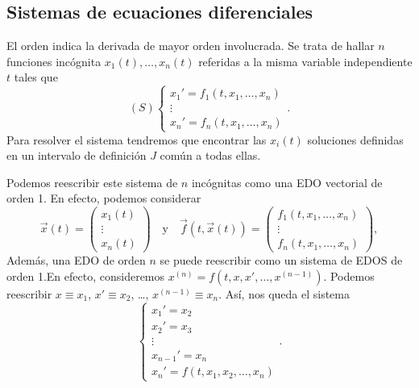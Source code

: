 \subsection{Sistemas de ecuaciones diferenciales}
\begin{definition}
El orden indica la derivada de mayor orden involucrada. Se trata de hallar $\displaystyle n $ funciones incógnita $\displaystyle x_{1}\left(t\right), \ldots, x_{n}\left(t\right) $ referidas a la misma variable independiente $\displaystyle t $ tales que
\[ \left(S\right)
\begin{cases}
x_{1}' = f_{1}\left(t, x_{1}, \ldots, x_{n}\right) \\
\vdots \\
x_{n}' = f_{n}\left(t, x_{1}, \ldots, x_{n}\right)
\end{cases}
.\]
Para resolver el sistema tendremos que encontrar las $\displaystyle x_{i}\left(t\right) $ soluciones definidas en un intervalo de definición $\displaystyle J $ común a todas ellas.
\end{definition}
Podemos reescribir este sistema de $\displaystyle n $ incógnitas como una EDO vectorial de orden 1. En efecto, podemos considerar
\[\vec{x}\left(t\right) = \begin{pmatrix} x_{1}\left(t\right) \\ \vdots \\ x_{n}\left(t\right) \end{pmatrix} \quad \text{y} \quad \vec{f}\left(t, \vec{x}\left(t\right)\right) = \begin{pmatrix} f_{1}\left(t, x_{1}, \ldots, x_{n}\right) \\ \vdots \\ f_{n}\left(t, x_{1}, \ldots, x_{n}\right) \end{pmatrix},\]
Además, una EDO de orden $\displaystyle n $ se puede reescribir como un sistema de EDOS de orden 1.En efecto, consideremos $\displaystyle x^{\left(n\right)} = f\left(t, x, x', \ldots, x^{\left(n-1\right)}\right) $. Podemos reescribir $\displaystyle x \equiv x_{1} $, $\displaystyle x' \equiv x_{2} $, \ldots, $\displaystyle x^{\left(n-1\right)} \equiv x_{n} $. Así, nos queda el sistema
\[
\begin{cases}
	x_{1}' = x_{2} \\
	x_{2}' = x_{3} \\
	\vdots \\
	x_{n-1}' = x_{n} \\
	x_{n}' = f\left(t, x_{1}, x_{2}, \ldots, x_{n}\right)
\end{cases}
.\]
